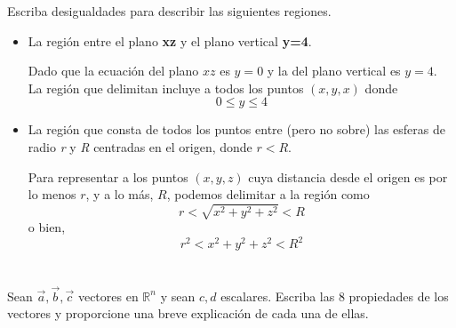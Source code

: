 \documentclass[12pt]{article}
\begin{document}
Escriba desigualdades para describir las siguientes regiones.

\begin{itemize}
    
\item La región entre el plano \textbf{xz} y el plano vertical \textbf{y=4}.

  Dado que la ecuación del plano $xz$ es $y=0$  y la del plano vertical es $y=4$. La región que delimitan incluye a todos los puntos $(x,y,x)$ donde
  $$0 \leq y \leq 4$$
    
\item La región que consta de todos los puntos entre (pero no sobre) las esferas de radio \textit{r} y \textit{R} centradas en el origen, donde $r < R$.

  Para representar a los puntos $(x,y,z)$ cuya distancia desde el origen es por lo menos $r$, y a lo más, $R$, podemos delimitar a la región como
  $$r < \sqrt{x^2 + y^2 + z^2} < R$$
  o bien,
  $$r^2 < x^2 + y^2 + z^2 < R^2$$
    
\end{itemize}
  
\section{}

Sean $\vec{a} , \vec{b} , \vec{c}$ vectores en $\mathbb{R}^n$ y sean $c,d$ escalares. Escriba las 8 propiedades de los vectores y proporcione una breve explicación de cada una de ellas.
\end{document}
